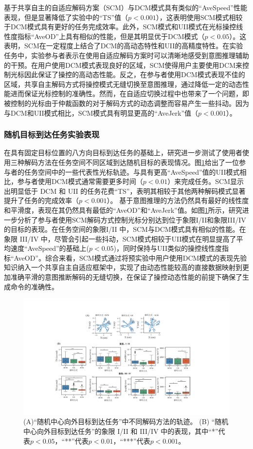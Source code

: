 基于共享自主的自适应解码方案（SCM）与DCM模式具有类似的``AveSpeed''性能表现，但是显著降低了实验中的``TS''值（$p<0.001$），这表明使用SCM模式相较于DCM模式具有更好的任务完成效率。此外，SCM模式和UII模式在光标操控线性度指标``AveOD''上具有相似的性能，但是其明显优于DCM模式（$p<0.05$）。这表明，SCM在一定程度上结合了DCM的高动态特性和UII的高精度特性。在实验任务中，实验参与者表示在使用自适应解码方案时可以清晰地感受到意图推理辅助的干预。在用户使用DCM模式表现良好的区域，SCM使得用户主要使用DCM来控制光标因此保证了操控的高动态性能。反之，在参与者使用DCM模式表现不佳的区域，共享自主解码方式将操控模式无缝切换至意图推理，通过降低一定的动态性能进而保证光标控制的准确性。然而，在自适应切换过程中也带来了一个问题，即被控制的光标由于仲裁函数的对于解码方式的动态调整而容易产生一些抖动。因为与DCM和UII模式相比，SCM模式具有明显更高的``AveJerk''值（$p<0.001$）。  

\subsubsection{随机目标到达任务实验表现}在具有固定目标位置的八方向目标到达任务的基础上，研究进一步测试了使用者使用三种解码方法在任务空间不同区域到达随机目标的表现情况。图\ref{fig:3-12}给出了一位参与者的任务空间中的一些代表性光标轨迹。与具有更高``AveSpeed''值的UII模式相比，参与者使用DCM模式通常需要更多时间（$p<0.01$）来完成任务。SCM显示出明显低于 DCM 和 UII 的任务花费``TS''，表明其相较于其他两种解码模式显著提升了任务的完成效率（$p<0.001$）。 基于意图推理的方法仍然具有最好的线性度和平滑度，表现在其仍然具有最低的``AveOD''和``AveJerk''值。如图\ref{fig:3-12}所示，研究进一步分析了参与者使用SCM解码方式控制光标分别达到位于象限I/II和象限III/IV的目标的表现。在任务空间的象限I/II 中，SCM与DCM模式具有相似的性能。在象限 III/IV 中，尽管会引起一些抖动，SCM模式相较于UII模式在明显提高了平均速度``AveSpeed''的基础上($p<0.05$)，同时保持与UII类似的操控线性度指标``AveOD''。综合来看，SCM模式通过将预实验中用户使用DCM模式的表现先验知识纳入一个共享自主自适应框架中，实现了由动态性能较高的直接数据映射到更加准确平滑的意图推断解码的无缝切换，在保证了操控动态性能的前提下确保了生成命令的准确性。  

\begin{figure}[htb]
    \includegraphics[width=1\textwidth]{figures/3-Fig-12.pdf}
    \caption{(A)“随机中心向外目标到达任务”中不同解码方法的轨迹。 (B) “随机中心向外目标到达任务”的象限 I/II 和 III/IV 中的表现，其中“*”代表$p<0.05$，“**”代表$p<0.01$，“***”代表$p<0.001$。}
    \label{fig:3-12}
\end{figure}

